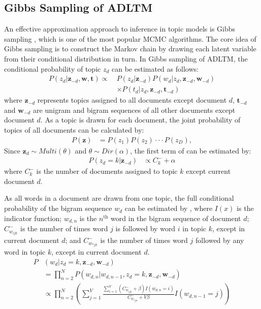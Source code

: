 \documentclass{article}
\newcommand{\z}{\mathbf{z}}
\newcommand{\w}{\mathbf{w}}
\newcommand{\tb}{\mathbf{t}}
\begin{document}
\subsection{Gibbs Sampling of \ac{ADLTM}}
An effective approximation approach to inference in topic models is Gibbs sampling  \cite{rosen2004author,griffiths2004finding}, which is one of the most popular \acl{MCMC} algorithms. The core idea of Gibbs sampling is to construct the Markov chain by drawing each latent variable from their conditional distribution in turn. In Gibbs sampling of \ac{ADLTM}, the conditional probability of topic $z_d$ can be estimated as follows:
%
\begin{equation} \label{eqa1}
\begin{split}
P(z_d|\z_{-d},\w, \tb) \propto \ & P(z_d|\z_{-d}) P(w_d|z_d,\z_{-d},\w_{-d}) \\
& \times P(t_d|z_d,\z_{-d},\tb_{-d})
\end{split}
\end{equation}
%
where $\z_{-d}$ represents topics assigned to all documents except document $d$, $\tb_{-d}$ and $\w_{-d}$ are unigram and bigram sequences of all other documents except document $d$. As a topic is drawn for each document, the joint probability of topics of all documents can be calculated by:
%
\begin{equation} \label{eq:dmclda2}
\begin{split}
P(\z) & = P(z_1) P(z_2) \cdot\cdot\cdot P(z_D),
\end{split}
\end{equation}
%
Since $\z_d \sim Multi(\theta)$ and $\theta \sim Dir(\alpha)$, the first term of  can be estimated by:
%
\begin{equation} \label{eq:dmclda3}
\begin{split}
P(z_d = k|\z_{-d}) & \propto C_k^{-} + \alpha
\end{split}
\end{equation}
%
where $C_k^-$ is the number of documents assigned to topic $k$ except current document $d$.


As all words in a document are drawn from one topic, the full conditional probability of the bigram sequence $w_d$ can be estimated by , where 
$I(x)$ is the indicator function; 
$w_{d,n}$ is the $n^{\mathrm{th}}$ word in the bigram sequence of document $d$; 
$C_{w_{ijk}}^-$ is the number of times word $j$ is followed by word $i$ in topic $k$, except in current document $d$; and 
$C_{w_{*jk}}^-$ is the number of times word $j$ followed by any word in topic $k$, except in current document $d$. 
%
\begin{equation} \label{eq:dmclda6}
\begin{split}
P&(w_{d}  | z_d = k, \z_{-d},\w_{-d}) \\  
&= \prod_{n=2}^{N} P(w_{d,n} | w_{d,n-1}, z_d = k, \z_{-d},\w_{-d}) \\ 
&\propto \prod_{n=2}^{N} \left( \sum_{j=1}^{V} \frac{\sum_{i=1}^{V}(C_{w_{ijk}}^{-} + \beta)I(w_{d,n} = i)}{C_{w_{*ju}} ^{-}+ V\beta} I(w_{d,n-1} = j) \right)
\end{split}
\end{equation}
\end{document}
